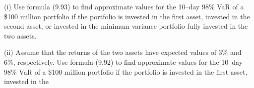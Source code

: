 (i) Use formula (9.93) to find approximate values for the 10--day 98\% VaR of
a \$100 million portfolio if the portfolio is invested in the first asset,
invested in the second asset, or invested in the minimum variance portfolio
fully invested in the two assets.

(ii) Assume that the returns of the two assets have expected values of 3\%
and 6\%, respectively. Use formula (9.92) to find approximate values for the
10--day 98\% VaR of a \$100 million portfolio if the portfolio is invested in
the first asset, invested in the
